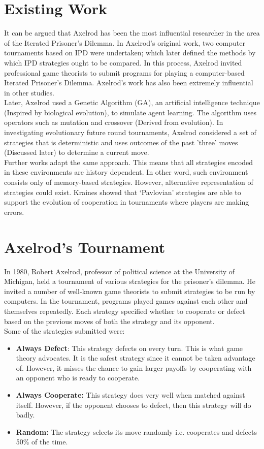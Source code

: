 \documentclass[a4paper]{article}
\begin{document}
	\section{Existing Work}
	
	It can be argued that Axelrod has been the most influential researcher in the area of the Iterated Prisoner's Dilemma. In Axelrod's original work, two computer tournaments based on IPD were undertaken; which later defined the methods by which IPD strategies ought to be compared. In this process, Axelrod invited professional game theorists to submit programs for playing a computer-based Iterated Prisoner's Dilemma. Axelrod's work has also been extremely influential in other studies.\\
	Later, Axelrod used a Genetic Algorithm (GA), an artificial intelligence technique (Inspired by biological evolution), to simulate agent learning. The algorithm uses operators such as mutation and crossover (Derived from evolution). In investigating evolutionary future round tournaments, Axelrod considered a set of strategies that is deterministic and uses outcomes of the past 'three' moves (Discussed later) to determine a current move.\\
	Further works adapt the same approach. This means that all strategies encoded in these environments are history dependent. In other word, such environment consists only of memory-based strategies. However, alternative representation of strategies could exist. Kraines showed that ‘Pavlovian’ strategies are able to support the evolution of cooperation in tournaments where players are making errors. 
	
	\section{Axelrod's Tournament}

	In 1980, Robert Axelrod, professor of political science at the University of Michigan, held a tournament of various strategies for the prisoner's dilemma. He invited a number of well-known game theorists to submit strategies to be run by computers. In the tournament, programs played games against each other and themselves repeatedly. Each strategy specified whether to cooperate or defect based on the previous moves of both the strategy and its opponent.\\
	Some of the strategies submitted were:
	\begin{itemize}
	\item \textbf{Always Defect}: This strategy defects on every turn. This is what game theory advocates. It is the safest strategy since it cannot be taken advantage of. However, it misses the chance to gain larger payoffs by cooperating with an opponent who is ready to cooperate.
	\item \textbf{Always Cooperate:} This strategy does very well when matched against itself. However, if the opponent chooses to defect, then this strategy will do badly.
	\item \textbf{Random:} The strategy selects its move randomly i.e. cooperates and defects 50\% of the time.
	\end{itemize}
	
\end{document}
